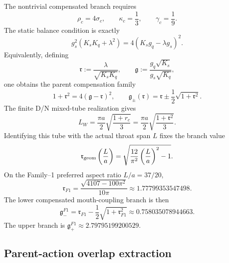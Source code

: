 The nontrivial compensated branch requires
\begin{equation}
\label{eq:part04-core-canonical-conditions}
\rho_c=4\sigma_c,
\qquad
\kappa_c=\frac13,
\qquad
\gamma_c=\frac19.
\end{equation}
The static balance condition is exactly
\begin{equation}
\label{eq:part04-core-coupling-balance}
g_s^2(K_sK_q+\lambda^2)
=
4(K_sg_q-\lambda g_s)^2.
\end{equation}
Equivalently, defining
\begin{equation}
\label{eq:part04-r-g-parent-ratios}
\mathfrak r:=\frac{\lambda}{\sqrt{K_sK_q}},
\qquad
\mathfrak g:=\frac{g_q\sqrt{K_s}}{g_s\sqrt{K_q}},
\end{equation}
one obtains the parent compensation family
\begin{equation}
\label{eq:part04-parent-compensation-family}
1+\mathfrak r^2=4(\mathfrak g-\mathfrak r)^2,
\qquad
\mathfrak g_\pm(\mathfrak r)=\mathfrak r\pm\frac12\sqrt{1+\mathfrak r^2}.
\end{equation}
The finite D/N mixed-tube realization gives
\begin{equation}
\label{eq:part04-LW-compensation}
L_W=\frac{\pi a}{2}\sqrt{\frac{1+r_c}{3}}
=\frac{\pi a}{2}\sqrt{\frac{1+\mathfrak r^2}{3}}.
\end{equation}
Identifying this tube with the actual throat span \(L\) fixes the branch value
\begin{equation}
\label{eq:part04-r-geom}
\mathfrak r_{\rm geom}\left(\frac La\right)
=
\sqrt{\frac{12}{\pi^2}\left(\frac La\right)^2-1}.
\end{equation}
On the Family--1 preferred aspect ratio \(L/a=37/20\),
\begin{equation}
\label{eq:part04-rF1}
\mathfrak r_{F1}
=
\frac{\sqrt{4107-100\pi^2}}{10\pi}
\approx1.77799353547498.
\end{equation}
The lower compensated mouth-coupling branch is then
\begin{equation}
\label{eq:part04-gminus-F1}
\mathfrak g_-^{F1}
=
\mathfrak r_{F1}-\frac12\sqrt{1+\mathfrak r_{F1}^2}
\approx0.758035078944663.
\end{equation}
The upper branch is \(\mathfrak g_+^{F1}\approx2.79795199200529\).

\subsection{Parent-action overlap extraction}
\label{subsec:part04-parent-overlap-extraction}

